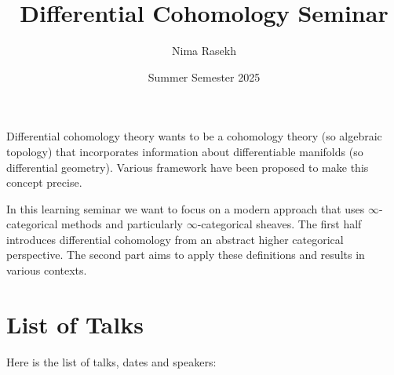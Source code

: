 \documentclass[10pt]{amsart}
\title{Differential Cohomology Seminar}
\date{Summer Semester 2025}
\author{Nima Rasekh}
\begin{document}
\maketitle


Differential cohomology theory wants to be a cohomology theory (so algebraic topology) that incorporates information about differentiable manifolds (so differential geometry). Various framework have been proposed to make this concept precise.

In this learning seminar we want to focus on a modern approach that uses $\infty$-categorical methods and particularly $\infty$-categorical sheaves. The first half introduces differential cohomology from an abstract higher categorical perspective. The second part aims to apply these definitions and results in various contexts.

\section{List of Talks}
Here is the list of talks, dates and speakers:
\end{document}
